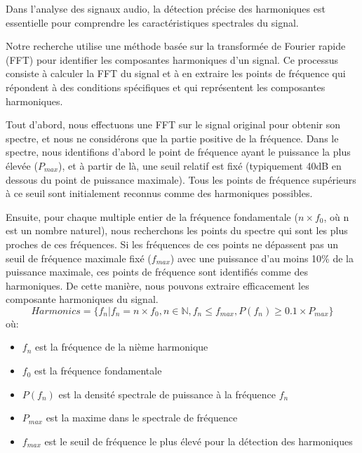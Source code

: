 Dans l'analyse des signaux audio, la détection précise des harmoniques est essentielle pour comprendre les caractéristiques spectrales du signal.

Notre recherche utilise une méthode basée sur la transformée de Fourier rapide (FFT) pour identifier les composantes harmoniques d'un signal. Ce processus consiste à calculer la FFT du signal et à en extraire les points de fréquence qui répondent à des conditions spécifiques et qui représentent les composantes harmoniques.

Tout d'abord, nous effectuons une FFT sur le signal original pour obtenir son spectre, et nous ne considérons que la partie positive de la fréquence. Dans le spectre, nous identifions d'abord le point de fréquence ayant le puissance la plus élevée (\(P_{max}\)), et à partir de là, une seuil relatif est fixé (typiquement 40dB en dessous du point de puissance maximale). Tous les points de fréquence supérieurs à ce seuil sont initialement reconnus comme des harmoniques possibles.

Ensuite, pour chaque multiple entier de la fréquence fondamentale (\(n \times f_0 \), où n est un nombre naturel), nous recherchons les points du spectre qui sont les plus proches de ces fréquences. Si les fréquences de ces points ne dépassent pas un seuil de fréquence maximale fixé (\(f_{max}\)) avec une puissance d'au moins 10\% de la puissance maximale, ces points de fréquence sont identifiés comme des harmoniques. De cette manière, nous pouvons extraire efficacement les composante harmoniques du signal.
\begin{equation}
    Harmonics = \{f_n | f_n = n \times f_0, n \in \mathbb{N}, f_n \leq f_{max}, P(f_n) \geq 0.1 \times P_{max} \}
\end{equation}
où:
\begin{itemize}
    \item \(f_n\) est la fréquence de la nième harmonique
    \item \(f_0\) est la fréquence fondamentale
    \item \(P(f_n)\) est la densité spectrale de puissance à la fréquence \(f_n\)
    \item \(P_{max}\) est la maxime dans le spectrale de fréquence 
    \item \(f_{max}\) est le seuil de fréquence le plus élevé pour la détection des harmoniques
\end{itemize}

